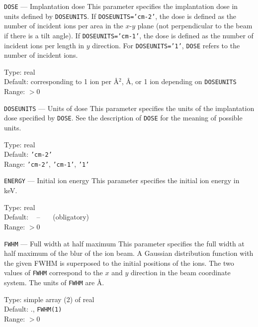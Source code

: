 \begin{keydescription}{\texttt{DOSE} --- Implantation dose}
%
  This parameter specifies the implantation dose in units defined by 
  \texttt{DOSEUNITS}. If \texttt{DOSEUNITS='cm-2'}, the dose is defined as
  the number of incident ions per area in the $x$-$y$ plane (not perpendicular
  to the beam if there is a tilt angle). If \texttt{DOSEUNITS='cm-1'}, the dose
  is defined as the number of incident ions per length in $y$ direction. For
  \texttt{DOSEUNITS='1'}, \texttt{DOSE} refers to the number of incident ions.
%
  \begin{keytab}
    Type:    \> real \\
    Default: \> corresponding to 1 ion per \AA$^2$,  \AA, or 1 ion
                depending on \texttt{DOSEUNITS} \\
    Range:   \> $> 0$
  \end{keytab}
\end{keydescription}

\begin{keydescription}{\texttt{DOSEUNITS} --- Units of dose}
%
  This parameter specifies the units of the implantation dose specified by
  \texttt{DOSE}. See the description of \texttt{DOSE} for the meaning of
  possible units.
%
  \begin{keytab}
    Type:    \> real \\
    Default: \> \texttt{'cm-2'} \\
    Range:   \> \texttt{'cm-2'}, \texttt{'cm-1'}, \texttt{'1'}
  \end{keytab}
\end{keydescription}

\begin{keydescription}{\texttt{ENERGY} --- Initial ion energy}
%
  This parameter specifies the initial ion energy in keV.
  \begin{keytab}
    Type:    \> real \\
    Default: \> ~ -- ~~~(obligatory) \\
    Range:   \> $> 0$
  \end{keytab}
\end{keydescription}

\begin{keydescription}{\texttt{FWHM} --- Full width at half maximum}
%
  This parameter specifies the full width at half maximum of the blur of the
  ion beam. A Gaussian distribution function with the given FWHM is superposed
  to the initial positions of the ions.  The two values of \texttt{FWHM}
  correspond to the $x$ and $y$ direction in the beam coordinate system. The
  units of \texttt{FWHM} are \AA.
  \begin{keytab}
    Type:    \> simple array (2) of real \\
    Default: ., \texttt{FWHM(1)} \\
    Range:   \> $> 0$
  \end{keytab}
\end{keydescription}

